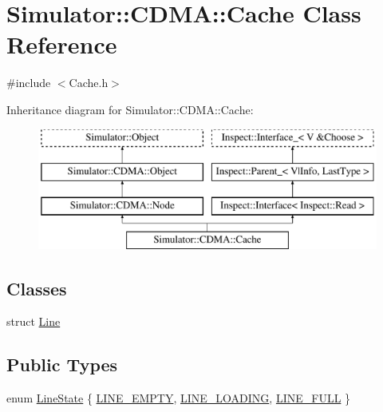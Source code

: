\hypertarget{class_simulator_1_1_c_d_m_a_1_1_cache}{\section{Simulator\+:\+:C\+D\+M\+A\+:\+:Cache Class Reference}
\label{class_simulator_1_1_c_d_m_a_1_1_cache}
}


{\ttfamily \#include $<$Cache.\+h$>$}

Inheritance diagram for Simulator\+:\+:C\+D\+M\+A\+:\+:Cache\+:\begin{figure}[H]
\begin{center}
\leavevmode
\includegraphics[height=4.000000cm]{class_simulator_1_1_c_d_m_a_1_1_cache}
\end{center}
\end{figure}
\subsection*{Classes}
\begin{DoxyCompactItemize}
\item 
struct \hyperlink{struct_simulator_1_1_c_d_m_a_1_1_cache_1_1_line}{Line}
\end{DoxyCompactItemize}
\subsection*{Public Types}
\begin{DoxyCompactItemize}
\item 
enum \hyperlink{class_simulator_1_1_c_d_m_a_1_1_cache_a77855c6e5bb01a9ab1da0e1cb5e80a3f}{Line\+State} \{ \hyperlink{class_simulator_1_1_c_d_m_a_1_1_cache_a77855c6e5bb01a9ab1da0e1cb5e80a3fa29df1e640019cb70fd127b7c5f758939}{L\+I\+N\+E\+\_\+\+E\+M\+P\+T\+Y}, 
\hyperlink{class_simulator_1_1_c_d_m_a_1_1_cache_a77855c6e5bb01a9ab1da0e1cb5e80a3fa136c6aa87a111e79aa5000d9703c8c3a}{L\+I\+N\+E\+\_\+\+L\+O\+A\+D\+I\+N\+G}, 
\hyperlink{class_simulator_1_1_c_d_m_a_1_1_cache_a77855c6e5bb01a9ab1da0e1cb5e80a3fa3f9255e31c684539da71b8f963e35734}{L\+I\+N\+E\+\_\+\+F\+U\+L\+L}
 \}
\end{DoxyCompactItemize}
